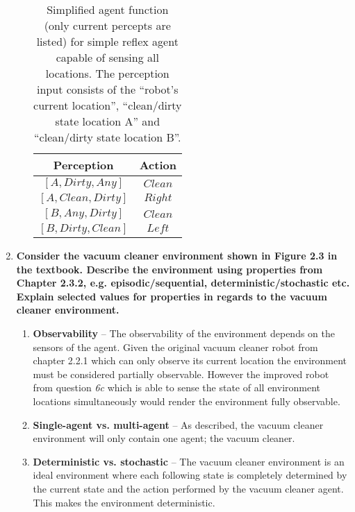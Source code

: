 \begin{enumerate}
\begin{enumerate}
\begin{table}
\begin{center}
\begin{tabular}{c|c}
\bfseries{Perception} & \bfseries{Action}\\
\hline
$\mathit{[A, Dirty, Any]}$ & $\mathit{Clean}$ \\
$\mathit{[A, Clean, Dirty]}$ & $\mathit{Right}$ \\
$\mathit{[B, Any, Dirty]}$ & $\mathit{Clean}$ \\
$\mathit{[B, Dirty, Clean]}$ & $\mathit{Left}$ \\
\end{tabular}
\caption{Simplified agent function (only current percepts are listed) for simple reflex agent capable of sensing all locations. The perception input consists of the ``robot's current location'', ``clean/dirty state location A'' and ``clean/dirty state location B''.}
\label{table:agent_function_reflex_percept}
\end{center}
\end{table}

\end{enumerate}

\item \textbf{Consider the vacuum cleaner environment shown in Figure 2.3 in the textbook. Describe the environment using properties from Chapter 2.3.2, e.g. episodic/sequential, deterministic/stochastic etc. Explain selected values for properties in regards to the vacuum cleaner environment.}

\begin{enumerate}

\item \textbf{Observability} -- The observability of the environment depends on the sensors of the agent. Given the original vacuum cleaner robot from chapter 2.2.1 which can only observe its current location the environment must be considered partially observable. However the improved robot from question \textit{6c} which is able to sense the state of all environment locations simultaneously would render the environment fully observable.

\item \textbf{Single-agent vs. multi-agent} -- As described, the vacuum cleaner environment will only contain one agent; the vacuum cleaner.

\item \textbf{Deterministic vs. stochastic} -- The vacuum cleaner environment is an ideal environment where each following state is completely determined by the current state and the action performed by the vacuum cleaner agent. This makes the environment deterministic.


\end{enumerate}
\end{enumerate}
